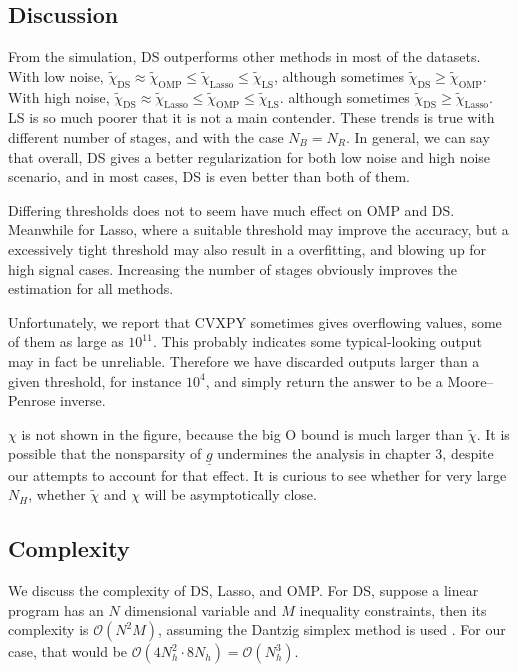 \documentclass[journal]{IEEEtran}
\newcommand {\D} {\cdot}
\newcommand {\m} [1] {\( #1 \)}
\newcommand {\V} [1] {\underline {#1}}
\newcommand {\RB} [1] {\left( #1 \right)}
\begin{document}
\subsection {Discussion}

From the simulation, DS outperforms other methods in most of the datasets.
With low noise, \m {\tilde {\chi} _{\mathrm {DS}} \approx \tilde {\chi} _{\mathrm {OMP}} \leq \tilde {\chi} _{\mathrm {Lasso}} \leq \tilde {\chi} _{\mathrm {LS}}},
although sometimes \m {\tilde {\chi} _{\mathrm {DS}} \geq \tilde {\chi} _{\mathrm {OMP}}}.
With high noise, \m {\tilde {\chi} _{\mathrm {DS}} \approx \tilde {\chi} _{\mathrm {Lasso}} \leq \tilde {\chi} _{\mathrm {OMP}} \leq \tilde {\chi} _{\mathrm {LS}}}.
although sometimes \m {\tilde {\chi} _{\mathrm {DS}} \geq \tilde {\chi} _{\mathrm {Lasso}}}.
LS is so much poorer that it is not a main contender.
These trends is true with different number of stages, and with the case \m {N_B = N_R}.
In general, we can say that overall, DS gives a better regularization for both low noise and high noise scenario, and in most cases, DS is even better than both of them.

Differing thresholds does not to seem have much effect on OMP and DS.
Meanwhile for Lasso, where a suitable threshold may improve the accuracy, but a excessively tight threshold may also result in a overfitting, and blowing up for high signal cases.
Increasing the number of stages obviously improves the estimation for all methods.

Unfortunately, we report that CVXPY sometimes gives overflowing values, some of them as large as \m {10^{11}}.
This probably indicates some typical-looking output may in fact be unreliable.
Therefore we have discarded outputs larger than a given threshold, for instance \m {10^4}, and simply return the answer to be a Moore–Penrose inverse.

\m {\chi} is not shown in the figure, because the big O bound is much larger than \m {\tilde {\chi}}.
It is possible that the nonsparsity of \m {\V {g}} undermines the analysis in chapter 3, despite our attempts to account for that effect.
It is curious to see whether for very large \m {N_H}, whether \m {\tilde {\chi}} and \m {\chi} will be asymptotically close.

\subsection {Complexity}

We discuss the complexity of DS, Lasso, and OMP.
For DS, suppose a linear program has an \m {N} dimensional variable and \m {M} inequality constraints, then its complexity is \m {\mathcal {O} \RB {N^2 M}}, assuming the Dantzig simplex method is used \cite {BoV04}.
For our case, that would be \m {\mathcal {O} \RB {4 N_h ^2 \D 8 N_h} = \mathcal {O} \RB {N_h ^3}}.
\end{document}
